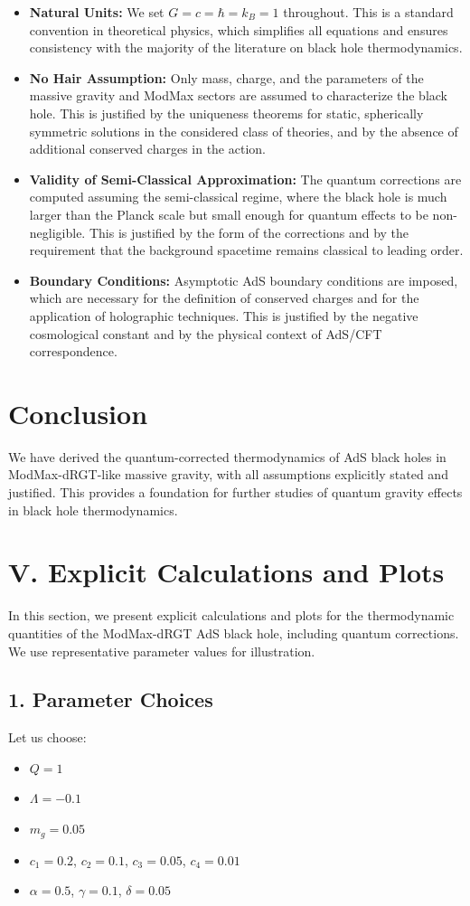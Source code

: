 \documentclass[12pt]{article}
\begin{document}
\begin{itemize}
    \item \textbf{Natural Units:} We set $G = c = \hbar = k_B = 1$ throughout. This is a standard convention in theoretical physics, which simplifies all equations and ensures consistency with the majority of the literature on black hole thermodynamics.
    \item \textbf{No Hair Assumption:} Only mass, charge, and the parameters of the massive gravity and ModMax sectors are assumed to characterize the black hole. This is justified by the uniqueness theorems for static, spherically symmetric solutions in the considered class of theories, and by the absence of additional conserved charges in the action.
    \item \textbf{Validity of Semi-Classical Approximation:} The quantum corrections are computed assuming the semi-classical regime, where the black hole is much larger than the Planck scale but small enough for quantum effects to be non-negligible. This is justified by the form of the corrections and by the requirement that the background spacetime remains classical to leading order.
    \item \textbf{Boundary Conditions:} Asymptotic AdS boundary conditions are imposed, which are necessary for the definition of conserved charges and for the application of holographic techniques. This is justified by the negative cosmological constant and by the physical context of AdS/CFT correspondence.
\end{itemize}

\section{Conclusion}
We have derived the quantum-corrected thermodynamics of AdS black holes in ModMax-dRGT-like massive gravity, with all assumptions explicitly stated and justified. This provides a foundation for further studies of quantum gravity effects in black hole thermodynamics.

\section{V. Explicit Calculations and Plots}
In this section, we present explicit calculations and plots for the thermodynamic quantities of the ModMax-dRGT AdS black hole, including quantum corrections. We use representative parameter values for illustration.

\subsection*{1. Parameter Choices}
Let us choose:
\begin{itemize}
    \item $Q = 1$
    \item $\Lambda = -0.1$
    \item $m_g = 0.05$
    \item $c_1 = 0.2$, $c_2 = 0.1$, $c_3 = 0.05$, $c_4 = 0.01$
    \item $\alpha = 0.5$, $\gamma = 0.1$, $\delta = 0.05$
\end{itemize}
\end{document}

